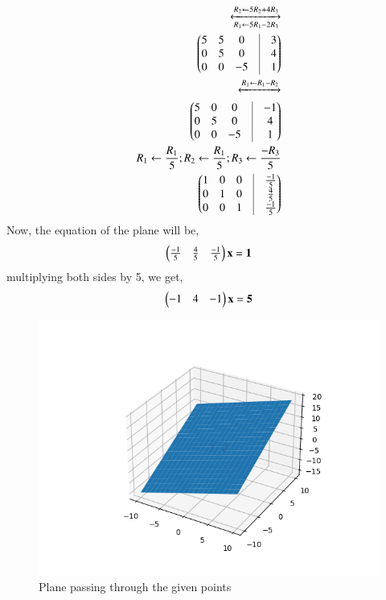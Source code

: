 \documentclass[A4,10pt,twocolumn]{IEEEtran}
\begin{document}
\begin{align}
\xleftrightarrow[R_1 \leftarrow 5R_1 - 2R_3]{R_2 \leftarrow 5R_2 + 4R_3}\\
\myvec{5&5&0&\vrule&3\\0&5&0&\vrule&4\\0&0&-5&\vrule&1}\\
\xleftrightarrow{R_1 \leftarrow R_1 - R_2}\\
\myvec{5&0&0&\vrule&-1\\0&5&0&\vrule&4\\0&0&-5&\vrule&1}\\
{R_1 \leftarrow \frac{R_1}{5}} ; {R_2 \leftarrow \frac{R_1}{5}}; {R_3 \leftarrow \frac{-R_3}{5}}\\
\myvec{1&0&0&\vrule&\frac{-1}{5}  \\ 0&1&0&\vrule&\frac{4}{5} \\0&0&1&\vrule&\frac{-1}{5}}
\end{align}
Now, the equation of the plane will be,
\begin{align}
\begin{pmatrix}\frac{-1}{5} & \frac{4}{5} & \frac{-1}{5}\end{pmatrix} \mathbf{x} = \mathbf{1}
\end{align}
multiplying both sides by 5, we get,
\begin{align}
\begin{pmatrix}-1 & 4 & -1 \end{pmatrix}\mathbf{x} = \mathbf{5}
\end{align}
\begin{figure}[h!]
  \centering
   \includegraphics[width=\columnwidth]{figs/plane_b.png}
    \caption{Plane passing through the given points }
     \label{fig:2}
     \end{figure} 
\end{document}
